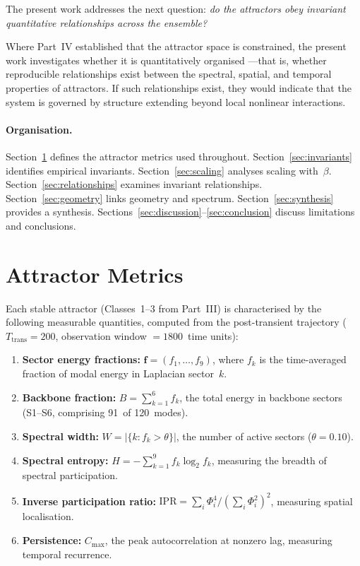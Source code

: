 \documentclass[12pt,a4paper]{article}
\begin{document}
The present work addresses the next question:
\emph{do the attractors obey invariant quantitative relationships
across the ensemble?}

Where Part~IV established that the attractor space is constrained,
the present work investigates whether it is quantitatively organised
---that is, whether reproducible relationships exist between the
spectral, spatial, and temporal properties of attractors.  If such
relationships exist, they would indicate that the system is governed
by structure extending beyond local nonlinear interactions.

\paragraph{Organisation.}
Section~\ref{sec:metrics} defines the attractor metrics used
throughout.  Section~\ref{sec:invariants} identifies empirical
invariants.  Section~\ref{sec:scaling} analyses scaling with~$\beta$.
Section~\ref{sec:relationships} examines invariant relationships.
Section~\ref{sec:geometry} links geometry and spectrum.
Section~\ref{sec:synthesis} provides a synthesis.
Sections~\ref{sec:discussion}--\ref{sec:conclusion} discuss
limitations and conclusions.


\section{Attractor Metrics}\label{sec:metrics}

Each stable attractor (Classes~1--3 from Part~III) is characterised
by the following measurable quantities, computed from the
post-transient trajectory ($T_{\mathrm{trans}} = 200$, observation
window $= 1800$~time units):

\begin{enumerate}[nosep]
\item \textbf{Sector energy fractions:}
  $\mathbf{f} = (f_1, \ldots, f_9)$, where $f_k$ is the
  time-averaged fraction of modal energy in Laplacian sector~$k$.

\item \textbf{Backbone fraction:}
  $B = \sum_{k=1}^{6} f_k$, the total energy in backbone sectors
  (S1--S6, comprising 91~of 120~modes).

\item \textbf{Spectral width:}
  $W = |\{k : f_k > \theta\}|$, the number of active sectors
  ($\theta = 0.10$).

\item \textbf{Spectral entropy:}
  $H = -\sum_{k=1}^{9} f_k \log_2 f_k$, measuring the breadth of
  spectral participation.

\item \textbf{Inverse participation ratio:}
  $\mathrm{IPR} = \sum_i \Phi_i^4 / (\sum_i \Phi_i^2)^2$,
  measuring spatial localisation.

\item \textbf{Persistence:}
  $C_{\max}$, the peak autocorrelation at nonzero lag, measuring
  temporal recurrence.
\end{enumerate}
\end{document}
